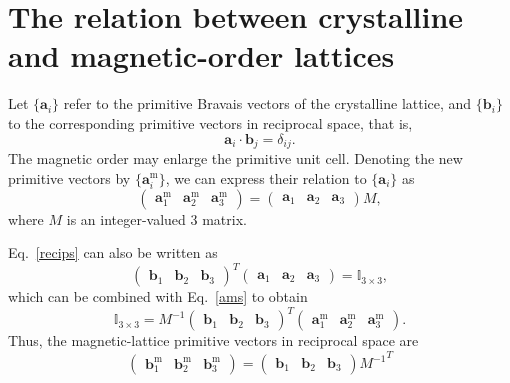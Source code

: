 \documentclass[12pt, a4paper]{article}
\newcommand{\m}{\textrm{m}}
\begin{document}
\section{The relation between crystalline and magnetic-order lattices}
Let $\{\bm{a}_i\}$ refer to the primitive Bravais vectors of the crystalline lattice, and $\{\bm{b}_i\}$ to the corresponding primitive vectors in reciprocal space, that is,
\begin{equation}\label{recips}
  \bm{a}_i\cdot\bm{b}_j=\delta_{ij}.
\end{equation}
The magnetic order may enlarge the primitive unit cell. Denoting the new primitive vectors by $\{\bm{a}^\textrm{m}_i\}$, we can express their relation to $\{\bm{a}_i\}$ as
\begin{equation}\label{ams}
  \begin{pmatrix}
    \bm{a}^{\m}_1&
    \bm{a}^{\m}_2&
    \bm{a}^{\m}_3
  \end{pmatrix}=
  \begin{pmatrix}
    \bm{a}_1&
    \bm{a}_2&
    \bm{a}_3
  \end{pmatrix}M,
\end{equation}
where $M$ is an integer-valued 3 matrix.

Eq.~\ref{recips} can also be written as
\begin{equation}
  {\begin{pmatrix}
    \bm{b}_1&
    \bm{b}_2&
    \bm{b}_3
  \end{pmatrix}}^T
  \begin{pmatrix}
    \bm{a}_1&
    \bm{a}_2&
    \bm{a}_3
  \end{pmatrix}=\mathbb{I}_{3\times3},
\end{equation}
which can be combined with Eq.~\ref{ams} to obtain
\begin{equation}
  \mathbb{I}_{3\times3}  = M^{-1}
  {\begin{pmatrix}
    \bm{b}_1&
    \bm{b}_2&
    \bm{b}_3
  \end{pmatrix}}^T
  \begin{pmatrix}
    \bm{a}^{\m}_1&
    \bm{a}^{\m}_2&
    \bm{a}^{\m}_3
  \end{pmatrix}.
\end{equation}
Thus, the magnetic-lattice primitive vectors in reciprocal space are
\begin{equation}
  \begin{pmatrix}
    \bm{b}^{\m}_1&
    \bm{b}^{\m}_2&
    \bm{b}^{\m}_3
  \end{pmatrix}
  =\begin{pmatrix}
    \bm{b}_1&
    \bm{b}_2&
    \bm{b}_3
  \end{pmatrix}{M^{-1}}^T
\end{equation}
\end{document}

